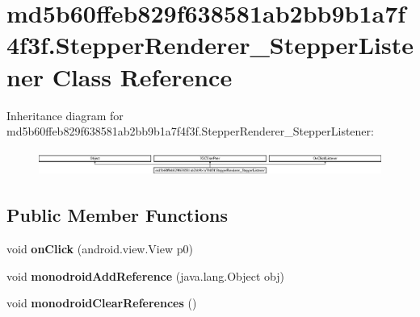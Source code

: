 \hypertarget{classmd5b60ffeb829f638581ab2bb9b1a7f4f3f_1_1StepperRenderer__StepperListener}{}\section{md5b60ffeb829f638581ab2bb9b1a7f4f3f.\+Stepper\+Renderer\+\_\+\+Stepper\+Listener Class Reference}
\label{classmd5b60ffeb829f638581ab2bb9b1a7f4f3f_1_1StepperRenderer__StepperListener}
Inheritance diagram for md5b60ffeb829f638581ab2bb9b1a7f4f3f.\+Stepper\+Renderer\+\_\+\+Stepper\+Listener\+:\begin{figure}[H]
\begin{center}
\leavevmode
\includegraphics[height=0.837070cm]{classmd5b60ffeb829f638581ab2bb9b1a7f4f3f_1_1StepperRenderer__StepperListener}
\end{center}
\end{figure}
\subsection*{Public Member Functions}
\begin{DoxyCompactItemize}
\item 
\mbox{\label{classmd5b60ffeb829f638581ab2bb9b1a7f4f3f_1_1StepperRenderer__StepperListener_ae013c0b5135d142b2c9092cba4e62af7}} 
void {\bfseries on\+Click} (android.\+view.\+View p0)
\item 
\mbox{\label{classmd5b60ffeb829f638581ab2bb9b1a7f4f3f_1_1StepperRenderer__StepperListener_aca2b5ea54afcdc9bbf86f2ca4d46b151}} 
void {\bfseries monodroid\+Add\+Reference} (java.\+lang.\+Object obj)
\item 
\mbox{\label{classmd5b60ffeb829f638581ab2bb9b1a7f4f3f_1_1StepperRenderer__StepperListener_aac50e9b6e66f8dcc19a5b7dfe491dad0}} 
void {\bfseries monodroid\+Clear\+References} ()
\end{DoxyCompactItemize}

